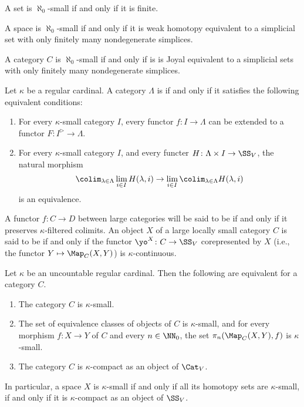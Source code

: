 \begin{eg}
	A set is $ \aleph_0 $-small if and only if it is finite.

	A space is $ \aleph_0 $-small if and only if it is weak homotopy equivalent to a simplicial set with only finitely many nondegenerate simplices.

	A category $ C $ is $ \aleph_0 $-small if and only if is is Joyal equivalent to a simplicial sets with only finitely many nondegenerate simplices. 
\end{eg}

\begin{definition}
	Let $ \kappa $ be a regular cardinal.
	A category $ \Lambda $ is  if and only if it satisfies the following equivalent conditions:
	\begin{enumerate}
		\item For every $ \kappa $-small category $ I $,
			every functor $ f \colon I \to \Lambda $ can be extended to a functor $ F \colon I^{\rhd} \to \Lambda $.
		\item For every $ \kappa $-small category $ I $, and every functer $ H \colon \Lambda \times I \to \SS_V$,
			the natural morphism
			\[
				\colim_{\lambda \in \Lambda} \lim_{i \in I} H(\lambda,i) \to \lim_{i \in I} \colim_{\lambda \in \Lambda} H(\lambda,i)
			\]
			is an equivalence.
	\end{enumerate}
	
	A functor $ f \colon C \to D $ between large categories will be said to be  if and only if it preserves $ \kappa $-filtered colimits.
	An object $ X $ of a large locally small category $ C $ is said to be  if and only if the functor $ \yo^X \colon C \to \SS_V$ corepresented by $ X $ (i.e., the functor $ Y \mapsto \Map_C(X,Y) $) is $ \kappa $-continuous.
\end{definition}

\begin{eg}
	Let $ \kappa $ be an uncountable regular cardinal.
	Then the following are equivalent for a category $ C $.
	\begin{enumerate}
		\item The category $ C $ is $ \kappa $-small.
		\item The set of equivalence classes of objects of $C$ is $ \kappa $-small,
			and for every morphism $ f \colon X \to Y $ of $ C $ and every $ n \in \NN_0$, the set $ \pi_n(\Map_C(X,Y),f) $ is $ \kappa $-small.
		\item The category $ C $ is $ \kappa $-compact as an object of $ \Cat_V $.
	\end{enumerate}
	In particular, a space $ X $ is $ \kappa $-small if and only if all its homotopy sets are $ \kappa $-small, if and only if it is $ \kappa $-compact as an object of $ \SS_V $.
\end{eg}

